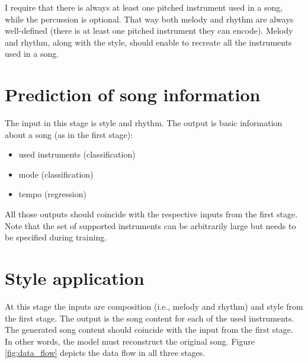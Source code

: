 \documentclass[en]{pracamgr}
\begin{document}
I require that there is always at least one pitched instrument used in a song, while the percussion is optional.
That way both melody and rhythm are always well-defined (there is at least one pitched instrument they can encode).
Melody and rhythm, along with the style, should enable to recreate all the instruments used in a song.

\section{Prediction of song information}

The input in this stage is style and rhythm.
The output is basic information about a song (as in the first stage):
\begin{itemize}
    \item used instruments (classification)
    \item mode (classification)
    \item tempo (regression)
\end{itemize}

All those outputs should coincide with the respective inputs from the first stage.
Note that the set of supported instruments can be arbitrarily large but needs to be specified during training.

\section{Style application}

At this stage the inputs are composition (i.e., melody and rhythm) and style from the first stage.
The output is the song content for each of the used instruments.
The generated song content should coincide with the input from the first stage.
In other words, the model must reconstruct the original song.
Figure \ref{fig:data_flow} depicts the data flow in all three stages.
\end{document}
